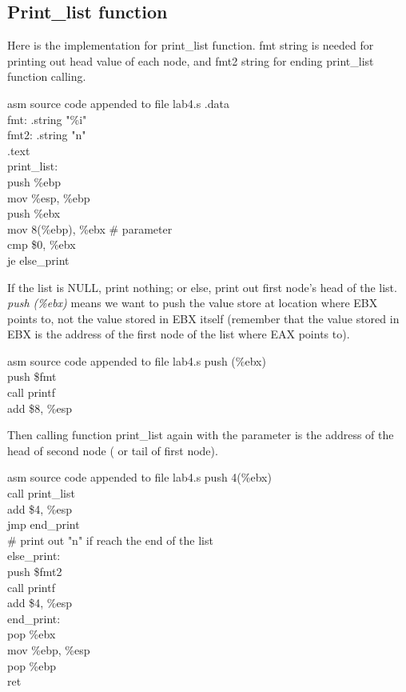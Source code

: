 \documentclass{article}
\begin{document}
\subsection{Print\_list function}
\begin{multicols}{2}
Here is the implementation for print\_list function. fmt string is needed for printing out head value of each node, and fmt2 string for ending print\_list function calling.
\begin{GFT}{asm source code appended to file lab4.s}
\+.data \\
\+  fmt: .string "\%i"\\
\+  fmt2: .string "\Backslash{}n"\\
\+.text\\
\+print\_list:\\
\+  push \%ebp\\
\+  mov \%esp, \%ebp\\
\+  push \%ebx\\
\+  mov 8(\%ebp), \%ebx 		\# parameter\\
\+  cmp \$0, \%ebx\\
\+  je else\_print\\
\end{GFT}
If the list is NULL, print nothing; or else, print out first node's head of the list. 
\\ \textit{push (\%ebx)} means we want to push the value store at location where EBX points to, not the value stored in EBX itself (remember that the value stored in EBX is the address of the first node of the list where EAX points to).
\begin{GFT}{asm source code appended to file lab4.s}
\+  push (\%ebx)\\
\+  push \$fmt\\
\+  call printf\\
\+  add \$8, \%esp\\
\end{GFT}

Then calling function print\_list again with the parameter is the address of the head of second node ( or tail of first node).
\begin{GFT}{asm source code appended to file lab4.s}
\+  push 4(\%ebx)\\
\+  call print\_list\\
\+  add \$4, \%esp\\
\+  jmp end\_print\\
\+\# print out "\Backslash{}n" if reach the end of the list\\
\+else\_print:\\
\+  push \$fmt2\\
\+  call printf\\
\+  add \$4, \%esp\\
\+end\_print:\\
\+  pop \%ebx\\
\+  mov \%ebp, \%esp\\
\+  pop \%ebp\\
\+  ret\\
\end{GFT}
\end{multicols}
\end{document}
